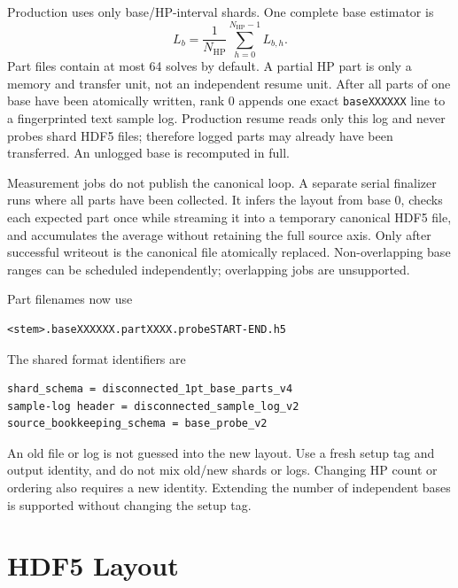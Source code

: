 \documentclass[11pt,a4paper]{article}
\newcommand{\code}[1]{\texttt{\begingroup\def\_{\textunderscore\allowbreak}#1\endgroup}}
\begin{document}
Production uses only base/HP-interval shards.  One complete base
estimator is
\begin{equation}
  L_b=\frac{1}{N_{\mathrm{HP}}}
  \sum_{h=0}^{N_{\mathrm{HP}}-1}L_{b,h}.
\end{equation}
Part files contain at most 64 solves by default.  A partial HP part is only a
memory and transfer unit, not an independent resume unit.  After all parts of one base have been atomically written,
rank 0 appends one exact \code{baseXXXXXX} line to a fingerprinted text sample
log.  Production resume reads only this log and never probes shard HDF5 files;
therefore logged parts may already have been transferred.  An unlogged base is
recomputed in full.

Measurement jobs do not publish the canonical loop.  A separate serial
finalizer runs where all parts have been collected.  It infers the layout from
base 0, checks each expected part once while streaming it into a temporary
canonical HDF5 file, and accumulates the average without retaining the full
source axis.  Only after successful writeout is the canonical file atomically
replaced.  Non-overlapping base ranges can be scheduled independently;
overlapping jobs are unsupported.

Part filenames now use
\begin{verbatim}
<stem>.baseXXXXXX.partXXXX.probeSTART-END.h5
\end{verbatim}
The shared format identifiers are
\begin{verbatim}
shard_schema = disconnected_1pt_base_parts_v4
sample-log header = disconnected_sample_log_v2
source_bookkeeping_schema = base_probe_v2
\end{verbatim}
An old file or log is not guessed into the new layout. Use a fresh setup tag
and output identity, and do not mix old/new shards or logs. Changing HP count
or ordering also requires a new identity. Extending the number of independent
bases is supported without changing the setup tag.

\section{HDF5 Layout}
\end{document}

